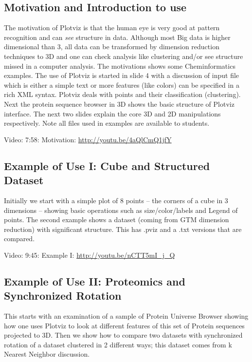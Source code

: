 \subsection{Motivation and Introduction to use}

The motivation of Plotviz is that the human eye is very good at pattern
recognition and can \textit{see} structure in data. Although most Big data is
higher dimensional than 3, all data can be transformed by dimension
reduction techniques to 3D and one can check analysis like clustering
and/or see structure missed in a computer analysis. The motivations
shows some Cheminformatics examples. The use of Plotviz is started in
slide 4 with a discussion of input file which is either a simple text or
more features (like colors) can be specified in a rich XML syntax.
Plotviz deals with points and their classification (clustering). Next
the protein sequence browser in 3D shows the basic structure of Plotviz
interface. The next two slides explain the core 3D and 2D manipulations
respectively. Note all files used in examples are available to students.

Video: 7:58: Motivation: \url{http://youtu.be/4aQlCmQ1jfY}

\subsection{Example of Use I: Cube and Structured
Dataset}\label{example-of-use-i-cube-and-structured-dataset}

Initially we start with a simple plot of 8 points -- the corners of a
cube in 3 dimensions -- showing basic operations such as
size/color/labels and Legend of points. The second example shows a
dataset (coming from GTM dimension reduction) with significant
structure. This has .pviz and a .txt versions that are compared.

Video: 9:45: Example I: \url{http://youtu.be/nCTT5mI_j_Q}

\subsection{Example of Use II: Proteomics and Synchronized
Rotation}\label{example-of-use-ii-proteomics-and-synchronized-rotation}

This starts with an examination of a sample of Protein Universe Browser
showing how one uses Plotviz to look at different features of this set
of Protein sequences projected to 3D. Then we show how to compare two
datasets with synchronized rotation of a dataset clustered in 2
different ways; this dataset comes from k Nearest Neighbor discussion.

